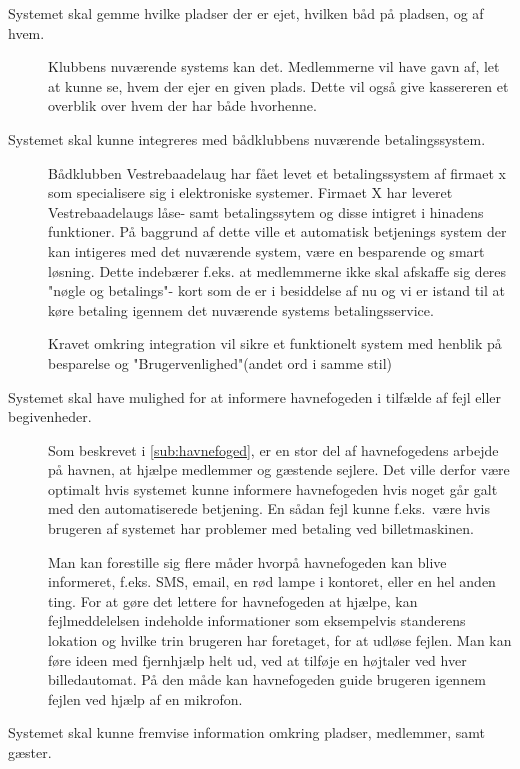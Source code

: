 \begin{description}
  \item[Systemet skal gemme hvilke pladser der er ejet, hvilken båd på pladsen, og af hvem.]

  Klubbens nuværende systems kan det. Medlemmerne vil have gavn af, let at kunne se, hvem der ejer en given plads. Dette vil også give kassereren et overblik over hvem der har både hvorhenne.

  \item[Systemet skal kunne integreres med bådklubbens nuværende betalingssystem.]
  
  
 Bådklubben Vestrebaadelaug har fået levet et betalingssystem af firmaet x som specialisere sig i elektroniske systemer. Firmaet X har leveret Vestrebaadelaugs
låse- samt betalingssytem og disse intigret i hinadens funktioner. På baggrund af dette ville et automatisk betjenings system der kan intigeres med det nuværende
system, være en besparende og smart løsning. Dette indebærer f.eks. at medlemmerne ikke skal afskaffe sig deres "nøgle og betalings"- kort som de er i besiddelse af nu og
vi er istand til at køre betaling igennem det nuværende systems betalingsservice. 

Kravet omkring integration vil sikre et funktionelt system med henblik på besparelse og "Brugervenlighed"(andet ord i samme stil)

  \item[Systemet skal have mulighed for at informere havnefogeden i tilfælde af fejl eller begivenheder.]

  Som beskrevet i \cref{sub:havnefoged}, er en stor del af havnefogedens arbejde på havnen, at hjælpe medlemmer og gæstende sejlere. Det ville derfor være optimalt hvis systemet kunne informere havnefogeden hvis noget går galt med den automatiserede betjening. En sådan fejl kunne f.eks.\ være hvis brugeren af systemet har problemer med betaling ved billetmaskinen.

  Man kan forestille sig flere måder hvorpå havnefogeden kan blive informeret, f.eks. SMS, email, en rød lampe i kontoret, eller en hel anden ting. For at gøre det lettere for havnefogeden at hjælpe, kan fejlmeddelelsen indeholde informationer som eksempelvis standerens lokation og hvilke trin brugeren har foretaget, for at udløse fejlen. Man kan føre ideen med fjernhjælp helt ud, ved at tilføje en højtaler ved hver billedautomat. På den måde kan havnefogeden guide brugeren igennem fejlen ved hjælp af en mikrofon.


  \item[Systemet skal kunne fremvise information omkring pladser, medlemmer, samt gæster.]


\end{description}
